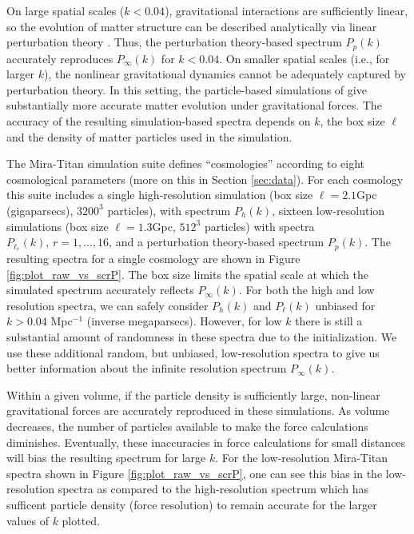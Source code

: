 \documentclass[11pt]{article}
\begin{document}
On large spatial scales ($k < 0.04$), 
gravitational interactions are sufficiently linear, so the evolution of matter structure 
can be described analytically via linear perturbation theory
\citep{pietroni2008flowing, lesgourgues2009non}.  Thus, the perturbation theory-based 
spectrum $P_{p}(k)$ accurately reproduces $P_\infty(k)$ for $k<0.04$.  On smaller spatial 
scales (i.e., for larger $k$), the nonlinear gravitational dynamics cannot be adequately 
captured by perturbation theory.  In this setting, the particle-based simulations of 
\cite{heitmann2016mira} give substantially more accurate matter evolution under gravitational forces.
The accuracy of the resulting simulation-based spectra depends on $k$, the box size $\ell$ 
and the density of matter particles used in the simulation. 


The Mira-Titan simulation suite \citep{moran2023mira}
defines ``cosmologies'' according to eight cosmological parameters (more on this
in Section \ref{sec:data}).  For each cosmology this suite includes a single high-resolution 
simulation (box size $\ell = 2.1$Gpc (gigaparsecs), $3200^3$ particles), with spectrum $P_h(k)$, 
sixteen low-resolution simulations (box size $\ell = 1.3$Gpc, $512^3$ particles) with spectra 
$P_{\ell_r}(k),\,r=1,\ldots,16$, and a perturbation theory-based spectrum $P_p(k)$. The resulting 
spectra for a single cosmology are shown in Figure \ref{fig:plot_raw_vs_scrP}.
The box size limits the spatial scale at which the simulated spectrum accurately reflects 
$P_\infty(k)$.  For both the high and low resolution spectra, we can safely consider $P_h(k)$ 
and $P_\ell(k)$ unbiased for $k > 0.04$ Mpc$^{-1}$  (inverse megaparsecs). However, for low $k$ 
there is still a substantial amount of randomness in these spectra due to the initialization.  
We use these additional random, but unbiased, low-resolution spectra to give us better 
information about the infinite resolution spectrum $P_\infty(k)$.

Within a given volume, if the particle density is sufficiently large, non-linear gravitational 
forces are accurately reproduced in these simulations.  As volume decreases, the number of 
particles available to make the force calculations diminishes.  Eventually, these inaccuracies 
in force calculations for small distances will bias the resulting spectrum for large $k$. 
For the low-resolution Mira-Titan spectra shown in Figure \ref{fig:plot_raw_vs_scrP}, one can 
see this bias in the low-resolution spectra as compared to the high-resolution spectrum which 
has sufficent particle density (force resolution) to remain accurate for the larger values of 
$k$ plotted.
\end{document}
